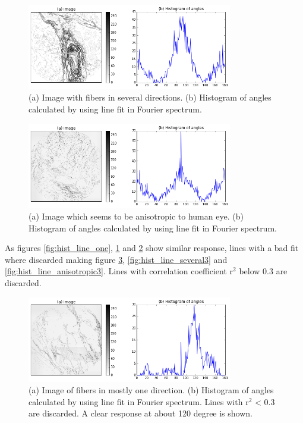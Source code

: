 \begin{figure}[h]
\centering
\includegraphics[width=0.8\textwidth]{hist_line_several}
\caption{(a) Image with fibers in several directions. (b) Histogram of angles calculated by using line fit in Fourier spectrum.}
\label{fig:hist_line_several}
\end{figure}

\begin{figure}[h]
\centering
\includegraphics[width=0.8\textwidth]{hist_line_anisotropic}
\caption{(a) Image which seems to be anisotropic to human eye. (b) Histogram of angles calculated by using line fit in Fourier spectrum.}
\label{fig:hist_line_anisotropic}
\end{figure}


As figures \ref{fig:hist_line_one}, \ref{fig:hist_line_several} and \ref{fig:hist_line_anisotropic} show similar response, lines with a bad fit where discarded making figure \ref{fig:hist_line_one3}, \ref{fig:hist_line_several3} and \ref{fig:hist_line_anisotropic3}. Lines with correlation coefficient r$^2$ below 0.3 are discarded.


\begin{figure}[h]
\centering
\includegraphics[width=0.8\textwidth]{hist_line_one3}
\caption{(a) Image of fibers in mostly one direction. (b) Histogram of angles calculated by using line fit in Fourier spectrum. Lines with r$^2$ < 0.3 are discarded. A clear response at about 120 degree is shown.}
\label{fig:hist_line_one3}
\end{figure}

